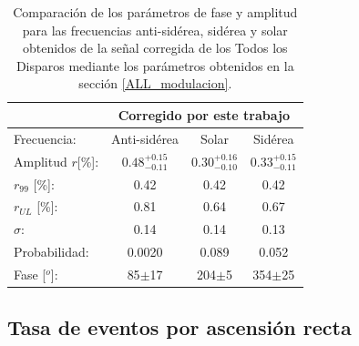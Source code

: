 		\begin{table}[H]
			\centering
			\begin{tabular}{rc|c|c|}
				\cline{2-4}
				\multicolumn{1}{r|}{} & \multicolumn{3}{c|}{Corregido por este  trabajo} \\ \hline
				\multicolumn{1}{|l|}{Frecuencia:      } & Anti-sidérea          & Solar        	 				& Sidérea        \\ \hline
				\multicolumn{1}{|l|}{Amplitud $r$[\%]:} & $0.48^{+0.15}_{-0.11}$& $0.30^{+0.16}_{-0.10}$        & $0.33^{+0.15}_{-0.11}$ \\
				\multicolumn{1}{|l|}{$r_{99}$ [\%]:   } & 0.42                  & 0.42                          & 0.42       \\
				\multicolumn{1}{|l|}{$r_{UL}$ [\%]:   } & 0.81                  & 0.64                          & 0.67       \\
				\multicolumn{1}{|l|}{$\sigma$:        } & 0.14                  & 0.14                          & 0.13          \\\hline
				\multicolumn{1}{|l|}{Probabilidad:    } & 0.0020                  & 0.089                       & 0.052          \\
				\multicolumn{1}{|l|}{Fase [$^o$]:            } & 85$\pm$17            & 204$\pm$5                    	& 354$\pm$25    \\\hline 
			\end{tabular}
			\caption{Comparación de los parámetros de fase y amplitud para las frecuencias anti-sidérea, sidérea y solar obtenidos de la señal corregida  de los  Todos los Disparos mediante los parámetros obtenidos en la sección \ref{ALL_modulacion}.}
			\label{table:parametros_rayleigh_correccion}
			\end{table}
	
\subsection{Tasa de eventos por ascensión recta}

